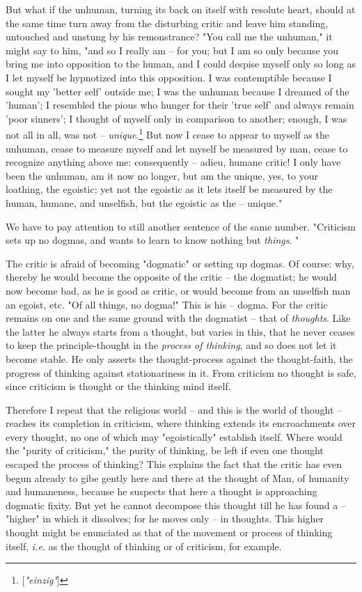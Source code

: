 But what if the unhuman, turning its back on itself with resolute heart, 
should at the same time turn away from the disturbing critic and leave him 
standing, untouched and unstung by his remonstrance? "{}You call me the 
unhuman,"{} it might say to him, "{}and so I really am -- for you; but I am so 
only because you bring me into opposition to the human, and I could despise 
myself only so long as I let myself be hypnotized into this opposition. I was 
contemptible because I sought my 'better self' outside me; I was the unhuman 
because I dreamed of the 'human'; I resembled the pious who hunger for their 
'true self' and always remain 'poor sinners'; I thought of myself only in 
comparison to another; enough, I was not all in all, was not -- 
\textit{unique}.\footnote{[\textit{"{}einzig"{}}]} But now I cease to appear 
to myself as the unhuman, cease to measure myself and let myself be measured 
by man, cease to recognize anything above me: consequently -- adieu, humane 
critic! I only have been the unhuman, am it now no longer, but am the unique, 
yes, to your loathing, the egoistic; yet not the egoistic as it lets itself be 
measured by the human, humane, and unselfish, but the egoistic as the -- 
unique."{}

We have to pay attention to still another sentence of the same number. 
"{}Criticism sets up no dogmas, and wants to learn to know nothing but 
\textit{things}. "{}

The critic is afraid of becoming "{}dogmatic"{} or setting up dogmas. Of 
course: why, thereby he would become the opposite of the critic -- the 
dogmatist; he would now become bad, as he is good as critic, or would become 
from an unselfish man an egoist, etc. "{}Of all things, no dogma!"{} This is 
his -- dogma. For the critic remains on one and the same ground with the 
dogmatist -- that of \textit{thoughts}. Like the latter he always starts from 
a thought, but varies in this, that he never ceases to keep the 
principle-thought in the \textit{process of thinking}, and so does not let it 
become stable. He only asserts the thought-process against the thought-faith, 
the progress of thinking against stationariness in it. From criticism no 
thought is safe, since criticism is thought or the thinking mind itself.

Therefore I repeat that the religious world -- and this is the world of 
thought -- reaches its completion in criticism, where thinking extends its 
encroachments over every thought, no one of which may "{}egoistically"{} 
establish itself. Where would the "{}purity of criticism,"{} the purity of 
thinking, be left if even one thought escaped the process of thinking? This 
explains the fact that the critic has even begun already to gibe gently here 
and there at the thought of Man, of humanity and humaneness, because he 
suspects that here a thought is approaching dogmatic fixity. But yet he cannot 
decompose this thought till he has found a -- "{}higher"{} in which it 
dissolves; for he moves only -- in thoughts. This higher thought might be 
enunciated as that of the movement or process of thinking itself, 
\textit{i.e.} as the thought of thinking or of criticism, for example.

